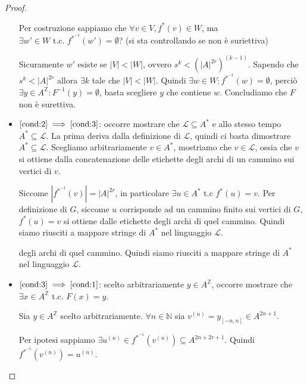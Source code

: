 \begin{teorema}
\begin{proof}
\begin{itemize}
                  Per costruzione sappiamo che $\forall v\in V, f^{\ast}(v)\in W$, ma $\exists
                      w'\in W\text{ t.c. } f^{\ast^{-1}} (w')= \emptyset$? (si sta controllando se non è suriettiva)

                  Sicuramente $w'$ esiste se $|V|<|W|$, ovvero  $s^k<(|A|^{2r})^{(k-1)}$.
                  Sapendo che $s^k < |A|^{2r}$ allora $\exists k$ tale che  $|V|<|W|$.
                  Quindi $\exists w \in W: f^{\ast^{-1}} (w) =\emptyset$, perciò
                  $\exists y \in A^{\mathbb{Z}}: F^{-1}(y) = \emptyset$, basta scegliere
                  $y$ che contiene $w$. Concludiamo che $F$ non è surettiva.

            \item $\ref{cond:2}\implies \ref{cond:3}$: occorre mostrare che $\mathcal{L} \subseteq A^\ast$
                  e allo stesso tempo $ A^\ast \subseteq\mathcal{L}$. La prima deriva
                  dalla definizione di $\mathcal{L}$, quindi ci basta dimostrare
                  $A^\ast \subseteq\mathcal{L}$. Scegliamo arbitrariamente $v\in  A^\ast$,
                  mostriamo che $v\in \mathcal{L}$, ossia che $v$ si ottiene dalla concatenazione
                  delle etichette degli archi di un cammino sui vertici di $v$.

                  Siccome $|f^{\ast^{-1}}(v)| = |A|^{2r}$, in particolare $\exists u \in A^\ast$
                  t.c $f^\ast(u) = v$. Per definizione di $G$, siccome $u$ corrisponde
                  ad un cammino finito sui vertici di $G$, $f^\ast(u)=v$ si ottiene dalle etichette
                  degli archi di quel cammino. Quindi siamo riusciti a mappare
                  stringe di $A^\ast$ nel linguaggio $\mathcal{L}$.

                  degli archi di quel cammino. Quindi siamo riusciti a mappare
                  stringe di $A^\ast$ nel linguaggio $\mathcal{L}$.
            \item $\ref{cond:3}\implies \ref{cond:1}$: scelto arbitrariamente $y\in A^\mathbb{Z}$,
                  occorre mostrare che $\exists x\in A^\mathbb{Z} \text{ t.c. } F(x) =y$.

                  Sia $y\in A^\mathbb{Z}$ scelto arbitrariamente. $\forall n\in \mathbb{N}$
                  sia $v^{(n)} = y_{[-n,n]}\in A^{2n+1}$.

                  Per ipotesi sappiamo $\exists u^{(n)}\in f^{\ast^{-1}}(v^{(n)})\subseteq A^{2n+2r+1}$.
                  Quindi $f^{\ast^{-1}}(v^{(n)}) = u^{(n)}$.


\end{itemize}
\end{proof}
\end{teorema}
